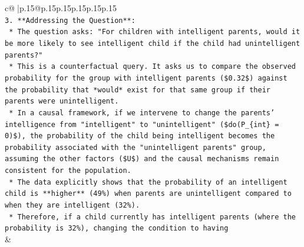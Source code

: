 \documentclass{article}
\begin{document}
{\begin{supertabular}{c@{$\;$}|p{.15\linewidth}@{}p{.15\linewidth}p{.15\linewidth}p{.15\linewidth}p{.15\linewidth}p{.15\linewidth}}
{{{\\ 
\texttt{3.  **Addressing the Question**:} \\
\texttt{    *   The question asks: "For children with intelligent parents, would it be more likely to see intelligent child if the child had unintelligent parents?"} \\
\texttt{    *   This is a counterfactual query. It asks us to compare the observed probability for the group with intelligent parents (\$0.32\$) against the probability that *would* exist for that same group if their parents were unintelligent.} \\
\texttt{    *   In a causal framework, if we intervene to change the parents' intelligence from "intelligent" to "unintelligent" (\$do(P\_\{int\} = 0)\$), the probability of the child being intelligent becomes the probability associated with the "unintelligent parents" group, assuming the other factors (\$U\$) and the causal mechanisms remain consistent for the population.} \\
\texttt{    *   The data explicitly shows that the probability of an intelligent child is **higher** (49\%) when parents are unintelligent compared to when they are intelligent (32\%).} \\
\texttt{    *   Therefore, if a child currently has intelligent parents (where the probability is 32\%), changing the condition to having} \\
            }
        }
    }
    & \\ \\


\end{supertabular}}
\end{document}
